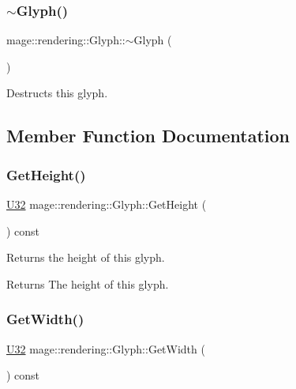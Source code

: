 \subsubsection{\texorpdfstring{$\sim$\+Glyph()}{~Glyph()}}
{\footnotesize\ttfamily mage\+::rendering\+::\+Glyph\+::$\sim$\+Glyph (\begin{DoxyParamCaption}{ }\end{DoxyParamCaption})\hspace{0.3cm}{\ttfamily [default]}}

Destructs this glyph. 

\subsection{Member Function Documentation}
\mbox{\label{structmage_1_1rendering_1_1_glyph_a67acfad4c7fe409493ca82f75c0a266f}} 
\subsubsection{\texorpdfstring{Get\+Height()}{GetHeight()}}
{\footnotesize\ttfamily \mbox{\hyperlink{namespacemage_a41c104c036fba3756a74e19f793eeaa1}{U32}} mage\+::rendering\+::\+Glyph\+::\+Get\+Height (\begin{DoxyParamCaption}{ }\end{DoxyParamCaption}) const\hspace{0.3cm}{\ttfamily [noexcept]}}

Returns the height of this glyph.

\begin{DoxyReturn}{Returns}
The height of this glyph. 
\end{DoxyReturn}
\mbox{\label{structmage_1_1rendering_1_1_glyph_a0c1f398017a59df8678d7d7f8ee6609e}} 
\subsubsection{\texorpdfstring{Get\+Width()}{GetWidth()}}
{\footnotesize\ttfamily \mbox{\hyperlink{namespacemage_a41c104c036fba3756a74e19f793eeaa1}{U32}} mage\+::rendering\+::\+Glyph\+::\+Get\+Width (\begin{DoxyParamCaption}{ }\end{DoxyParamCaption}) const\hspace{0.3cm}{\ttfamily [noexcept]}}

